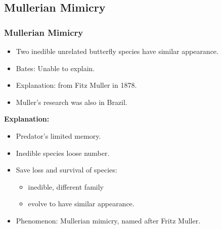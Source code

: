 %	

\subsection{Mullerian Mimicry}

\frame
{
	\frametitle{Mullerian Mimicry}
	
	\begin{itemize}
		\item Two inedible unrelated butterfly species have similar appearance. 
		\item Bates: Unable to explain.
		\item Explanation: from Fitz Muller in 1878.
		\item Muller's research was also in Brazil.
	\end{itemize}

\textbf{Explanation:}
	\begin{itemize}
		\item Predator's limited memory.
		\item Inedible species loose number.
		\item Save loss and survival of species:
			\begin{itemize}
				\item inedible, different family 
				\item evolve to have similar appearance.
			\end{itemize}
		\item Phenomenon: Mullerian mimicry, named after Fritz Muller.
	\end{itemize}
}

